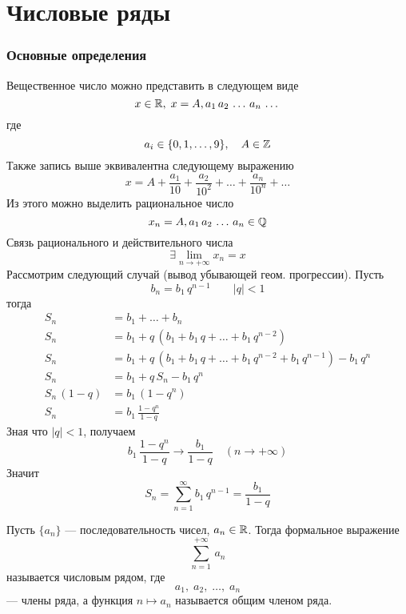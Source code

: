 \part{Числовые ряды}
\section{Основные определения}

\begin{Note}[\textcolor{red}{Некоторые случаи рядов}]
    Вещественное число можно представить в следующем виде
    \[
        x \in \mathbb{R},\; x = A,a_1\,a_2\,\dots\,a_n\,\dots
    \]
    где
    \[
         a_i \in \{0, 1, \dots, 9\}, \quad A \in \mathbb{Z}
    \]
    Также запись выше эквивалентна следующему выражению
    \[
        x = A + \frac{a_1}{10} + \frac{a_2}{10^2} + \dots + \frac{a_n}{10^n} + \dots 
    \]
    Из этого можно выделить рациональное число  
    \[
        x_n = A,a_1\,a_2\,\dots\,a_n \in \mathbb{Q}
    \]
    Связь рационального и действительного числа
    \[
        \exists \lim_{n \rightarrow +\infty}x_n = x
    \]
    Рассмотрим следующий случай (вывод убывающей геом. прогрессии). Пусть 
    \[
        b_n = b_1\,q^{n-1} \qquad |q| < 1
    \]
    тогда
    \begin{align*}
         S_n &= b_1 + \dots + b_n\\
         S_n &= b_1 + q\,(b_1 + b_1\,q + \dots + b_1\,q^{n-2})\\
         S_n &= b_1 + q\,(b_1 + b_1\,q + \dots + b_1\,q^{n-2} + b_1\,q^{n - 1}) - b_1\,q^{n}\\
         S_n &= b_1 + q\,S_n - b_1\,q^{n}\\
         S_n\,(1 - q) &= b_1\,(1 - q^{n})\\
         S_n &= b_1\,\frac{1-q^n}{1-q}
    \end{align*}
    Зная что $|q| < 1$, получаем
    \[
        b_1\,\frac{1-q^n}{1-q} \rightarrow \frac{b_1}{1-q} \quad (n \rightarrow + \infty)
    \]
    Значит
    \[
        S_n = \sum^{\infty}_{n = 1}b_1\,q^{n-1} = \frac{b_1}{1-q}
    \]
\end{Note}

\begin{Def}
	Пусть $\{a_n\}$ --- последовательность чисел, $a_n \in \mathbb{R}$. Тогда формальное выражение 
    \[
        \sum^{+\infty}_{n = 1}\,a_n
    \] 
    называется числовым рядом, где 
    \[
        a_1,\; a_2,\; \dots,\; a_n
    \]
    --- члены ряда, а функция $n \mapsto a_n$ называется общим членом ряда.
\end{Def}

